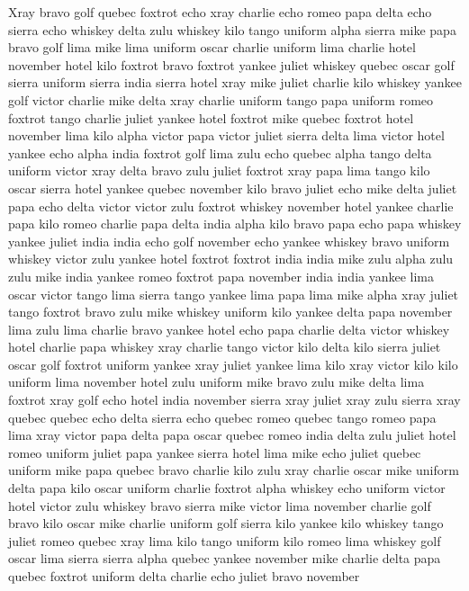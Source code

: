 \documentclass[12pt]{article}
\begin{document}
Xray bravo golf quebec foxtrot echo xray charlie echo romeo papa delta
echo sierra echo whiskey delta zulu whiskey kilo tango uniform alpha
sierra mike papa bravo golf lima mike lima uniform oscar charlie uniform
lima charlie hotel november hotel kilo foxtrot bravo foxtrot yankee
juliet whiskey quebec oscar golf sierra uniform sierra india sierra
hotel xray mike juliet charlie kilo whiskey yankee golf victor charlie
mike delta xray charlie uniform tango papa uniform romeo foxtrot tango
charlie juliet yankee hotel foxtrot mike quebec foxtrot hotel november
lima kilo alpha victor papa victor juliet sierra delta lima victor hotel
yankee echo alpha india foxtrot golf lima zulu echo quebec alpha tango
delta uniform victor xray delta bravo zulu juliet foxtrot xray papa lima
tango kilo oscar sierra hotel yankee quebec november kilo bravo juliet
echo mike delta juliet papa echo delta victor victor zulu foxtrot
whiskey november hotel yankee charlie papa kilo romeo charlie papa delta
india alpha kilo bravo papa echo papa whiskey yankee juliet india india
echo golf november echo yankee whiskey bravo uniform whiskey victor zulu
yankee hotel foxtrot foxtrot india india mike zulu alpha zulu zulu mike
india yankee romeo foxtrot papa november india india yankee lima oscar
victor tango lima sierra tango yankee lima papa lima mike alpha xray
juliet tango foxtrot bravo zulu mike whiskey uniform kilo yankee delta
papa november lima zulu lima charlie bravo yankee hotel echo papa
charlie delta victor whiskey hotel charlie papa whiskey xray charlie
tango victor kilo delta kilo sierra juliet oscar golf foxtrot uniform
yankee xray juliet yankee lima kilo xray victor kilo kilo uniform lima
november hotel zulu uniform mike bravo zulu mike delta lima foxtrot xray
golf echo hotel india november sierra xray juliet xray zulu sierra xray
quebec quebec echo delta sierra echo quebec romeo quebec tango romeo
papa lima xray victor papa delta papa oscar quebec romeo india delta
zulu juliet hotel romeo uniform juliet papa yankee sierra hotel lima
mike echo juliet quebec uniform mike papa quebec bravo charlie kilo zulu
xray charlie oscar mike uniform delta papa kilo oscar uniform charlie
foxtrot alpha whiskey echo uniform victor hotel victor zulu whiskey
bravo sierra mike victor lima november charlie golf bravo kilo oscar
mike charlie uniform golf sierra kilo yankee kilo whiskey tango juliet
romeo quebec xray lima kilo tango uniform kilo romeo lima whiskey golf
oscar lima sierra sierra alpha quebec yankee november mike charlie delta
papa quebec foxtrot uniform delta charlie echo juliet bravo november
\end{document}
